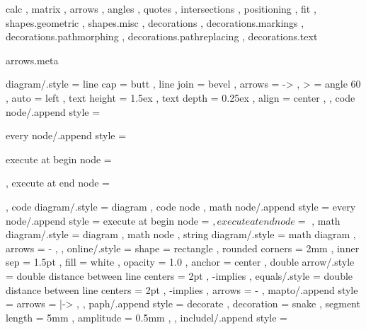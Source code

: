 \usetikzlibrary
{
	calc ,
	matrix ,
	arrows ,
	angles ,
	quotes ,
	intersections ,
	positioning ,
	fit ,
	shapes.geometric ,
	shapes.misc ,
	decorations ,
	decorations.markings ,
	decorations.pathmorphing ,
	decorations.pathreplacing ,
	decorations.text %
}

\usepgflibrary
{
	arrows.meta
}



\usepackage{xcolor}

\tikzset
{
	diagram/.style =
	{
		line cap = butt ,
		line join = bevel ,
		arrows = -> ,
		> = angle 60 ,
		auto = left ,
		text height = 1.5ex , %
		text depth = 0.25ex , %
		align = center ,
	} ,
	code node/.append style =
	{
		every node/.append style =
		{
			execute at begin node = \begin{texttt} ,
			execute at end node = \end{texttt}
		}
	} ,
	code diagram/.style =
	{
		diagram ,
		code node
	} ,
	math node/.append style =
	{
		every node/.append style =
		{
			execute at begin node = \begin{math} ,
			execute at end node = \end{math}
		}
	} ,
	math diagram/.style =
	{
		diagram ,
		math node
	} ,
	string diagram/.style =
	{
		math diagram ,
		arrows = - ,
	} ,
	online/.style =
	{
		shape = rectangle ,
		rounded corners = 2mm ,
		inner sep = 1.5pt ,
		fill = white ,
		opacity = 1.0 ,
		anchor = center	
	} ,
	double arrow/.style =
	{
		double distance between line centers = 2pt ,
		-implies %
	} ,
	equals/.style =
	{
		double distance between line centers = 2pt ,
		-implies , %
		arrows = -
	} ,
	mapto/.append style =
	{
		arrows = |-> ,
	} ,
	paph/.append style =
	{
		decorate ,
		decoration = {snake , segment length = 5mm , amplitude = 0.5mm} ,
	} ,
	includel/.append style =
}
